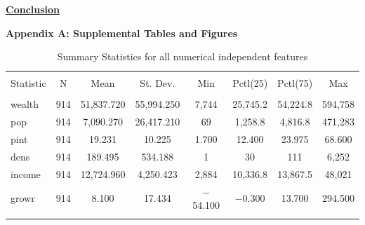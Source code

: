 \documentclass[11pt]{article}\usepackage[]{graphicx}\usepackage[]{color}
\begin{document}
\noindent\textbf{\underline{Conclusion}}
\hfill \break


\clearpage
\newpage
\noindent \Large{{\bf Appendix A: Supplemental Tables and Figures}}

\begin{center}

\begin{table}[H] \centering 
  \caption{Summary Statistics for all numerical independent features} 
  \label{descrips} 
\begin{tabular}{@{\extracolsep{5pt}}lccccccc} 
\\[-1.8ex]\hline 
\hline \\[-1.8ex] 
Statistic & \multicolumn{1}{c}{N} & \multicolumn{1}{c}{Mean} & \multicolumn{1}{c}{St. Dev.} & \multicolumn{1}{c}{Min} & \multicolumn{1}{c}{Pctl(25)} & \multicolumn{1}{c}{Pctl(75)} & \multicolumn{1}{c}{Max} \\ 
\hline \\[-1.8ex] 
wealth & 914 & 51,837.720 & 55,994.250 & 7,744 & 25,745.2 & 54,224.8 & 594,758 \\ 
pop & 914 & 7,090.270 & 26,417.210 & 69 & 1,258.8 & 4,816.8 & 471,283 \\ 
pint & 914 & 19.231 & 10.225 & 1.700 & 12.400 & 23.975 & 68.600 \\ 
dens & 914 & 189.495 & 534.188 & 1 & 30 & 111 & 6,252 \\ 
income & 914 & 12,724.960 & 4,250.423 & 2,884 & 10,336.8 & 13,867.5 & 48,021 \\ 
growr & 914 & 8.100 & 17.434 & $-$54.100 & $-$0.300 & 13.700 & 294.500 \\ 
\hline \\[-1.8ex] 
\end{tabular} 
\end{table} 

\end{center} 
\end{document}
